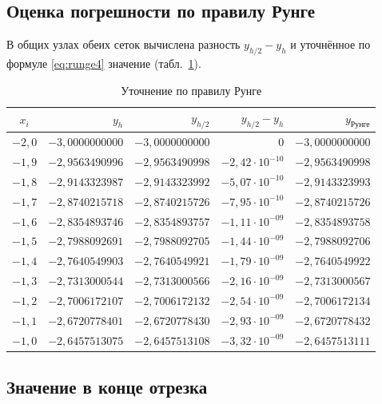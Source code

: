 \documentclass[14pt,a4paper]{extarticle}
\begin{document}
\subsection{Оценка погрешности по правилу Рунге}

В общих узлах обеих сеток вычислена разность $y_{h/2}-y_h$ и уточнённое
по формуле \eqref{eq:runge4} значение (табл.~\ref{tab:runge}).

\begin{table}[H]
    \centering
    \caption{Уточнение по правилу Рунге}
    \label{tab:runge}
    \small
    \begin{tabular}{crrrr}
        \toprule
        $x_i$ & $y_h$ & $y_{h/2}$ & $y_{h/2}-y_h$ & $y_{\text{Рунге}}$\\
        \midrule
        $-2{,}0$ & $-3{,}0000000000$ & $-3{,}0000000000$ & $0$ & $-3{,}0000000000$\\
        $-1{,}9$ & $-2{,}9563490996$ & $-2{,}9563490998$ & $-2{,}42\cdot10^{-10}$ & $-2{,}9563490998$\\
        $-1{,}8$ & $-2{,}9143323987$ & $-2{,}9143323992$ & $-5{,}07\cdot10^{-10}$ & $-2{,}9143323993$\\
        $-1{,}7$ & $-2{,}8740215718$ & $-2{,}8740215726$ & $-7{,}95\cdot10^{-10}$ & $-2{,}8740215726$\\
        $-1{,}6$ & $-2{,}8354893746$ & $-2{,}8354893757$ & $-1{,}11\cdot10^{-09}$ & $-2{,}8354893758$\\
        $-1{,}5$ & $-2{,}7988092691$ & $-2{,}7988092705$ & $-1{,}44\cdot10^{-09}$ & $-2{,}7988092706$\\
        $-1{,}4$ & $-2{,}7640549903$ & $-2{,}7640549921$ & $-1{,}79\cdot10^{-09}$ & $-2{,}7640549922$\\
        $-1{,}3$ & $-2{,}7313000544$ & $-2{,}7313000566$ & $-2{,}16\cdot10^{-09}$ & $-2{,}7313000567$\\
        $-1{,}2$ & $-2{,}7006172107$ & $-2{,}7006172132$ & $-2{,}54\cdot10^{-09}$ & $-2{,}7006172134$\\
        $-1{,}1$ & $-2{,}6720778401$ & $-2{,}6720778430$ & $-2{,}93\cdot10^{-09}$ & $-2{,}6720778432$\\
        $-1{,}0$ & $-2{,}6457513075$ & $-2{,}6457513108$ & $-3{,}32\cdot10^{-09}$ & $-2{,}6457513111$\\
        \bottomrule
    \end{tabular}
\end{table}

\subsection{Значение в конце отрезка}
\end{document}
